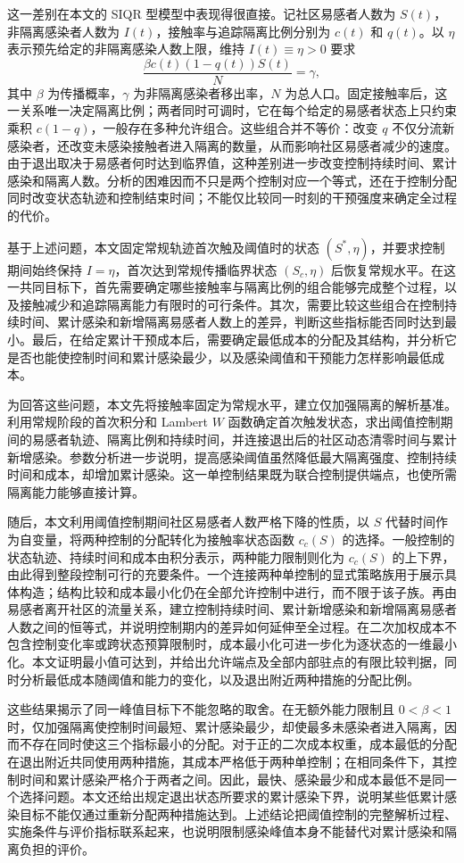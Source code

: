 \documentclass[lang=cn,a4paper,newtx]{elegantpaper}
\numberwithin{equation}{section}
\theoremstyle{plain}
\begin{document}
这一差别在本文的 SIQR 型模型中表现得很直接。记社区易感者人数为 $S(t)$，非隔离感染者人数为 $I(t)$，接触率与追踪隔离比例分别为 $c(t)$ 和 $q(t)$。以 $\eta$ 表示预先给定的非隔离感染人数上限，维持 $I(t)\equiv\eta>0$ 要求
\[
\frac{\beta c(t)(1-q(t))S(t)}{N}=\gamma,
\]
其中 $\beta$ 为传播概率，$\gamma$ 为非隔离感染者移出率，$N$ 为总人口。固定接触率后，这一关系唯一决定隔离比例；两者同时可调时，它在每个给定的易感者状态上只约束乘积 $c(1-q)$，一般存在多种允许组合。这些组合并不等价：改变 $q$ 不仅分流新感染者，还改变未感染接触者进入隔离的数量，从而影响社区易感者减少的速度。由于退出取决于易感者何时达到临界值，这种差别进一步改变控制持续时间、累计感染和隔离人数。分析的困难因而不只是两个控制对应一个等式，还在于控制分配同时改变状态轨迹和控制结束时间；不能仅比较同一时刻的干预强度来确定全过程的代价。

基于上述问题，本文固定常规轨迹首次触及阈值时的状态 $(S^*,\eta)$，并要求控制期间始终保持 $I=\eta$，首次达到常规传播临界状态 $(S_c,\eta)$ 后恢复常规水平。在这一共同目标下，首先需要确定哪些接触率与隔离比例的组合能够完成整个过程，以及接触减少和追踪隔离能力有限时的可行条件。其次，需要比较这些组合在控制持续时间、累计感染和新增隔离易感者人数上的差异，判断这些指标能否同时达到最小。最后，在给定累计干预成本后，需要确定最低成本的分配及其结构，并分析它是否也能使控制时间和累计感染最少，以及感染阈值和干预能力怎样影响最低成本。

为回答这些问题，本文先将接触率固定为常规水平，建立仅加强隔离的解析基准。利用常规阶段的首次积分和 Lambert $W$ 函数确定首次触发状态，求出阈值控制期间的易感者轨迹、隔离比例和持续时间，并连接退出后的社区动态清零时间与累计新增感染。参数分析进一步说明，提高感染阈值虽然降低最大隔离强度、控制持续时间和成本，却增加累计感染。这一单控制结果既为联合控制提供端点，也使所需隔离能力能够直接计算。

随后，本文利用阈值控制期间社区易感者人数严格下降的性质，以 $S$ 代替时间作为自变量，将两种控制的分配转化为接触率状态函数 $c_c(S)$ 的选择。一般控制的状态轨迹、持续时间和成本由积分表示，两种能力限制则化为 $c_c(S)$ 的上下界，由此得到整段控制可行的充要条件。一个连接两种单控制的显式策略族用于展示具体构造；结构比较和成本最小化仍在全部允许控制中进行，而不限于该子族。再由易感者离开社区的流量关系，建立控制持续时间、累计新增感染和新增隔离易感者人数之间的恒等式，并说明控制期内的差异如何延伸至全过程。在二次加权成本不包含控制变化率或跨状态预算限制时，成本最小化可进一步化为逐状态的一维最小化。本文证明最小值可达到，并给出允许端点及全部内部驻点的有限比较判据，同时分析最低成本随阈值和能力的变化，以及退出附近两种措施的分配比例。

这些结果揭示了同一峰值目标下不能忽略的取舍。在无额外能力限制且 $0<\beta<1$ 时，仅加强隔离使控制时间最短、累计感染最少，却使最多未感染者进入隔离，因而不存在同时使这三个指标最小的分配。对于正的二次成本权重，成本最低的分配在退出附近共同使用两种措施，其成本严格低于两种单控制；在相同条件下，其控制时间和累计感染严格介于两者之间。因此，最快、感染最少和成本最低不是同一个选择问题。本文还给出规定退出状态所要求的累计感染下界，说明某些低累计感染目标不能仅通过重新分配两种措施达到。上述结论把阈值控制的完整解析过程、实施条件与评价指标联系起来，也说明限制感染峰值本身不能替代对累计感染和隔离负担的评价。
\end{document}
